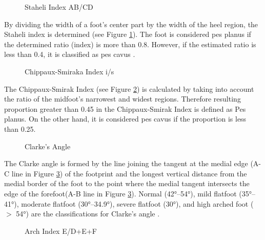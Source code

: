 \begin{figure}[htbp]
\centering
{}
\caption{Staheli Index AB/CD \cite{radiopaediamearysangle}}
\label{fig:MethodologyStaheliIndex}
\end{figure}

By dividing the width of a foot's center part by the width of the heel region, the Staheli index is determined (see Figure \ref{fig:MethodologyStaheliIndex}). The foot is considered pes planus if the determined ratio (index) is more than 0.8. However, if the estimated ratio is less than 0.4, it is classified as pes cavus \cite{almaawi2019flatfoot}.

\begin{figure}[htbp]
\centering
{}
\caption{Chippaux-Smiraka Index i/s \cite{radiopaediamearysangle}}
\label{fig:MethodologyChippauxSmirakaIndex}
\end{figure}

The Chippaux-Smirak Index (see Figure \ref{fig:MethodologyChippauxSmirakaIndex}) is calculated by taking into account the ratio of the midfoot's narrowest and widest regions. Therefore resulting proportion greater than 0.45 in the Chippaux-Smirak Index is defined as Pes planus. On the other hand, it is considered pes cavus\cite{almaawi2019flatfoot} if the proportion is less than 0.25.

\begin{figure}[htbp]
\centering
{}
\caption{Clarke's Angle \cite{ozer2012evaluation}}
\label{fig:MethodologyClarkesAngle}
\end{figure}

The Clarke angle is formed by the line joining the tangent at the medial edge (A-C line in Figure \ref{fig:MethodologyClarkesAngle}) of the footprint and the longest vertical distance from the medial border of the foot to the point where the medial tangent intersects the edge of the forefoot(A-B line in Figure \ref{fig:MethodologyClarkesAngle}). Normal (42°–54°), mild flatfoot (35°–41°), moderate flatfoot (30°–34.9°), severe flatfoot (30°), and high arched foot ($>$ 54°) are the classifications for Clarke's angle \cite{hegazy2021comparing}.

\begin{figure}[htbp]
\centering
{}
\caption{Arch Index E/D+E+F \cite{ozer2012evaluation}}
\label{fig:MethodologyArchIndex}
\end{figure}


